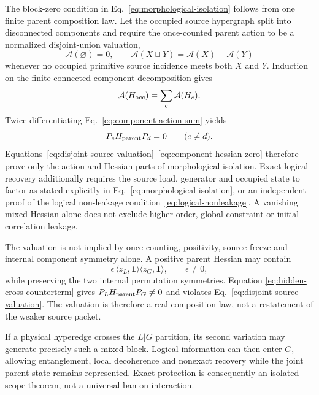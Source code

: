 \documentclass[11pt]{article}
\begin{document}
The block-zero condition in Eq.~\eqref{eq:morphological-isolation} follows
from one finite parent composition law. Let the occupied source hypergraph
split into disconnected components and require the once-counted parent action
to be a normalized disjoint-union valuation,
\begin{equation}
 \mathcal A(\varnothing)=0,\qquad
 \mathcal A(X\sqcup Y)=\mathcal A(X)+\mathcal A(Y)
 \label{eq:disjoint-source-valuation}
\end{equation}
whenever no occupied primitive source incidence meets both $X$ and $Y$.
Induction on the finite connected-component decomposition gives
\begin{equation}
 \mathcal A(H_{\rm occ})=\sum_c\mathcal A(H_c).
 \label{eq:component-action-sum}
\end{equation}
Twice differentiating Eq.~\eqref{eq:component-action-sum} yields
\begin{equation}
 P_cH_{\rm parent}P_d=0\qquad(c\neq d).
 \label{eq:component-hessian-zero}
\end{equation}
Equations~\eqref{eq:disjoint-source-valuation}--\eqref{eq:component-hessian-zero}
therefore prove only the action and Hessian parts of morphological isolation.
Exact logical recovery additionally requires the source load, generator and
occupied state to factor as stated explicitly in
Eq.~\eqref{eq:morphological-isolation}, or an independent proof of the
logical non-leakage condition~\eqref{eq:logical-nonleakage}.  A vanishing
mixed Hessian alone does not exclude higher-order, global-constraint or
initial-correlation leakage.

The valuation is not implied by once-counting, positivity, source freeze and
internal component symmetry alone. A positive parent Hessian may contain
\begin{equation}
 \epsilon\,
 \langle z_L,\mathbf 1\rangle
 \langle z_G,\mathbf 1\rangle,
 \qquad \epsilon\neq0,
 \label{eq:hidden-cross-counterterm}
\end{equation}
while preserving the two internal permutation symmetries. Equation
\eqref{eq:hidden-cross-counterterm} gives
$P_LH_{\rm parent}P_G\neq0$ and violates
Eq.~\eqref{eq:disjoint-source-valuation}. The valuation is therefore a real
composition law, not a restatement of the weaker source packet.

If a physical hyperedge crosses the $L|G$ partition, its second variation may
generate precisely such a mixed block. Logical information can then enter
$G$, allowing entanglement, local decoherence and nonexact recovery while the
joint parent state remains represented. Exact protection is consequently an
isolated-scope theorem, not a universal ban on interaction.
\end{document}
